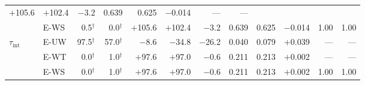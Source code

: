 \begin{adjustbox}{max width=\textwidth}
\begin{tabular}{@{}l l rr rrr rrr rr@{}}
  $+$105.6 & $+$102.4 & $-$3.2 & 0.639 & 0.625 & $-$0.014 & --- & --- \\
 & E-WS & 0.5$^{\dagger}$ & 0.0$^{\dagger}$ &
  $+$105.6 & $+$102.4 & $-$3.2 & 0.639 & 0.625 & $-$0.014 & 1.00 & 1.00 \\[3pt]
$\tau_{\text{int}}$ & E-UW & 97.5$^{\dagger}$ & 57.0$^{\dagger}$ &
  $-$8.6 & $-$34.8 & $-$26.2 & 0.040 & 0.079 & $+$0.039 & --- & --- \\
 & E-WT & 0.0$^{\dagger}$ & 1.0$^{\dagger}$ &
  $+$97.6 & $+$97.0 & $-$0.6 & 0.211 & 0.213 & $+$0.002 & --- & --- \\
 & E-WS & 0.0$^{\dagger}$ & 1.0$^{\dagger}$ &
  $+$97.6 & $+$97.0 & $-$0.6 & 0.211 & 0.213 & $+$0.002 & 1.00 & 1.00 \\
\bottomrule
\end{tabular}
\end{adjustbox}
